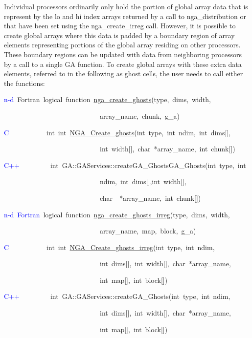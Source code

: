 Individual processors ordinarily only hold the portion of global array
data that is represent by the lo and hi index arrays returned by a
call to nga\_distribution or that have been set using the nga\_create\_irreg
call. However, it is possible to create global arrays where this data
is padded by a boundary region of array elements representing portions
of the global array residing on other processors. These boundary regions
can be updated with data from neighboring processors by a call to
a single GA function. To create global arrays with these extra data
elements, referred to in the following as ghost cells, the user needs
to call either the functions:
\begin{lyxcode}
\textcolor{blue}{n-d}~Fortran~logical~function~\href{http://www.emsl.pnl.gov/docs/global/ga_ops.html\#ga_create_ghosts}{nga\_{}create\_{}ghosts}(type,~dims,~width,

~~~~~~~~~~~~~~~~~~~~~~~~~~~~array\_name,~chunk,~g\_a)

\textcolor{blue}{C}~~~~~~~~~~~int~int~\href{http://www.emsl.pnl.gov/docs/global/c_nga_ops.html\#nga_create_ghosts}{NGA\_{}Create\_{}ghosts}(int~type,~int~ndim,~int~dims{[}{]},

~~~~~~~~~~~~~~~~~~~~~~~~~~~~int~width{[}{]},~char~{*}array\_name,~int~chunk{[}{]})

\textcolor{blue}{C++}~~~~~~~~~int~GA::GAServices::createGA\_GhostsGA\_Ghosts(int~type,~int

~~~~~~~~~~~~~~~~~~~~~~~~~~~~ndim,~int~dims{[}{]},int~width{[}{]},~

~~~~~~~~~~~~~~~~~~~~~~~~~~~~char~~{*}array\_name,~int~chunk{[}{]})

\textcolor{blue}{n-d~Fortran}~logical~function~\href{http://www.emsl.pnl.gov/docs/global/ga_ops.html\#ga_create_ghosts_irreg}{nga\_{}create\_{}ghosts\_{}irreg}(type,~dims,~width,

~~~~~~~~~~~~~~~~~~~~~~~~~~~~array\_name,~map,~block,~g\_a)~

\textcolor{blue}{C}~~~~~~~~~~~int~int~\href{http://www.emsl.pnl.gov/docs/global/c_nga_ops.html\#nga_create_ghosts_irreg}{NGA\_{}Create\_{}ghosts\_{}irreg}(int~type,~int~ndim,~

~~~~~~~~~~~~~~~~~~~~~~~~~~~~int~dims{[}{]},~int~width{[}{]},~char~{*}array\_name,

~~~~~~~~~~~~~~~~~~~~~~~~~~~~int~map{[}{]},~int~block{[}{]})~

\textcolor{blue}{C++}~~~~~~~~~int~GA::GAServices::createGA\_Ghosts(int~type,~int~ndim,~

~~~~~~~~~~~~~~~~~~~~~~~~~~~~int~dims{[}{]},~int~width{[}{]},~char~{*}array\_name,

~~~~~~~~~~~~~~~~~~~~~~~~~~~~int~map{[}{]},~int~block{[}{]})~


\end{lyxcode}
